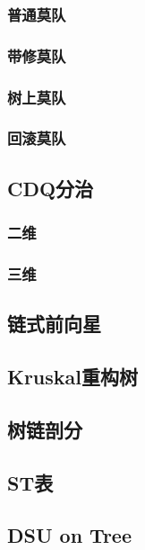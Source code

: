 \documentclass[twocolumn,a4paper]{article}  %
\begin{document}
\subsubsection{普通莫队}

\subsubsection{带修莫队}

\subsubsection{树上莫队}

\subsubsection{回滚莫队}


\subsection{CDQ分治}
\subsubsection{二维}

\subsubsection{三维}

\subsection{链式前向星}

\subsection{Kruskal重构树}

\subsection{树链剖分}

\subsection{ST表}

\subsection{DSU on Tree}

\end{document}
